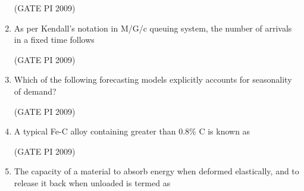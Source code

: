 \documentclass[journal,12pt,onecolumn]{IEEEtran}
\theoremstyle{remark}
\begin{document}
\begin{enumerate}
\hfill (GATE PI 2009)
\item As per Kendall's notation in M/G/c queuing system, the number of arrivals in a fixed time follows
\begin{enumerate}
\end{enumerate}
\hfill (GATE PI 2009)
\item Which of the following forecasting models explicitly accounts for seasonality of demand?
\begin{enumerate}
\end{enumerate}
\hfill (GATE PI 2009)
\item A typical Fe-C alloy containing greater than 0.8\% C is known as
\begin{enumerate}
\end{enumerate}
\hfill (GATE PI 2009)
\item The capacity of a material to absorb energy when deformed elastically, and to release it back when unloaded is termed as
\begin{enumerate}

\end{enumerate}
\end{enumerate}
\end{document}

